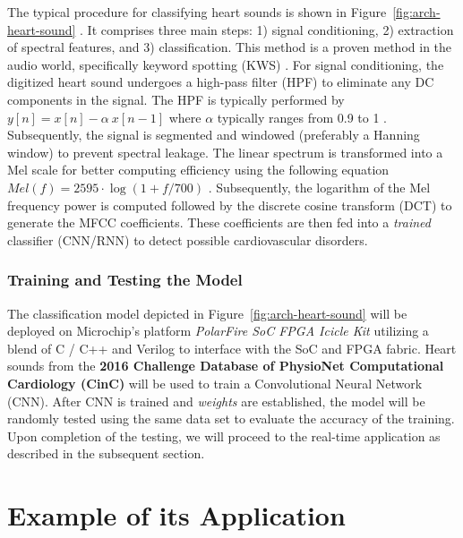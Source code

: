 \documentclass[12pt]{article}
\begin{document}
The typical procedure for classifying heart sounds is shown in Figure~\ref{fig:arch-heart-sound} \cite{gupta2007neural, nguyen2023heart}. It comprises three main steps: 1) signal conditioning, 2) extraction of spectral features, and 3) classification. This method is a proven method in the audio world, specifically keyword spotting (KWS) \cite{chong20220}. For signal conditioning, the digitized heart sound undergoes a high-pass filter (HPF) to eliminate any DC components in the signal. The HPF is typically performed by $y[n] = x[n] - \alpha~x[n-1]$ where $\alpha$ typically ranges from 0.9 to 1 \cite{han2006efficient}. Subsequently, the signal is segmented and windowed (preferably a Hanning window) to prevent spectral leakage.  The linear spectrum is transformed into a Mel scale for better computing efficiency using the following equation $Mel(f) = 2595\cdot \log(1 + f/700)$ \cite{han2006efficient}.
Subsequently, the logarithm of the Mel frequency power is computed followed by the discrete cosine transform (DCT) to generate the MFCC coefficients. These coefficients are then fed into a \textit{trained} classifier (CNN/RNN) to detect possible cardiovascular disorders.

\subsubsection*{Training and Testing the Model}
The classification model depicted in Figure~\ref{fig:arch-heart-sound} will be deployed on Microchip's platform \textit{PolarFire SoC FPGA Icicle Kit} utilizing a blend of C / C++ and Verilog to interface with the SoC and FPGA fabric.
Heart sounds from the \textbf{2016 Challenge Database of PhysioNet Computational Cardiology (CinC)} \cite{liu2016open} will be used to train a Convolutional Neural Network (CNN). After CNN is trained and \textit{weights} are established, the model will be randomly tested using the same data set to evaluate the accuracy of the training. Upon completion of the testing, we will proceed to the real-time application as described in the subsequent section.

\section{Example of its Application}
\end{document}
